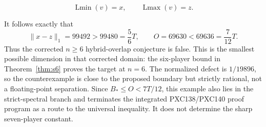 \documentclass[11pt]{article}
\newcommand{\Lmin}{\operatorname{Lmin}}
\newcommand{\Lmax}{\operatorname{Lmax}}
\begin{document}
\begin{equation}
 \Lmin(v)=x,\qquad \Lmax(v)=z.                         \tag{PXC143c}
\end{equation}

It follows exactly that
\begin{equation}
 \|x-z\|_1=99492>99480=\frac56T,\qquad
 O=69630<69636=\frac7{12}T.                            \tag{PXC143d}
\end{equation}
Thus the corrected \(n\ge6\) hybrid-overlap conjecture is false.  This is
the smallest possible dimension in that corrected domain: the six-player
bound in Theorem~\ref{thm:s6} proves the target at \(n=6\).  The normalized
defect is \(1/19896\), so the counterexample is close to the proposed
boundary but strictly rational, not a floating-point separation.  Since
\(B_*\le O<7T/12\), this example also lies in the strict-spectral branch and
terminates the integrated PXC138/PXC140 proof program as a route to the
universal inequality.  It does not determine the sharp seven-player
constant.
\end{document}
